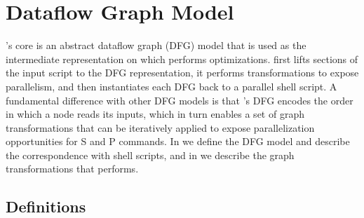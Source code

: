 \documentclass[letterpaper,twocolumn,10pt]{article}
\newcommand{\tcn}[1]{\mbox{\textcircled{\scriptsize #1}}}
\newcommand{\tsta}{\tcn{\textsc{S}}\xspace}
\newcommand{\tpur}{\tcn{\textsc{P}}\xspace}
\newcommand{\nv}[1]{[{\color{cyan}nv: #1}]}
\newcommand{\kk}[1]{[{\color{magenta}kk: #1}]}
\begin{document}
\section{Dataflow Graph Model}
\label{ir}

\sys's core is an abstract dataflow graph (DFG) model that is used as the intermediate representation on which \sys performs optimizations.
\sys first lifts sections of the input script to the DFG
representation, it performs transformations to expose parallelism, and
then instantiates each DFG back to a parallel shell script.  A
fundamental difference with other DFG models is that \sys's DFG encodes the
order in which a node reads its inputs, which in turn enables a set of
graph transformations that can be iteratively applied to expose
parallelization opportunities for \tsta and \tpur commands.
In  we define the DFG model and describe the
correspondence with shell scripts, and in  we
describe the graph transformations that \sys performs.




\subsection{Definitions}
\label{graph-components}
\end{document}
